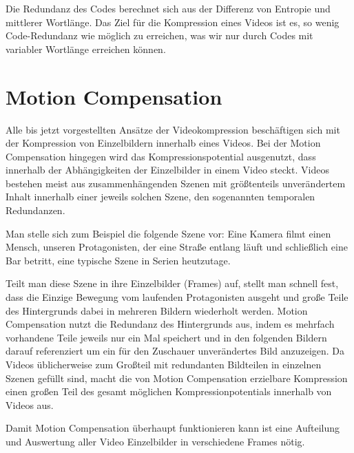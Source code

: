 Die Redundanz des Codes berechnet sich aus der Differenz von Entropie und mittlerer Wortlänge. Das Ziel für die Kompression eines Videos ist es, so wenig Code-Redundanz wie möglich zu erreichen, was wir nur durch Codes mit variabler Wortlänge erreichen können.


\section{Motion Compensation}

Alle bis jetzt vorgestellten Ansätze der Videokompression beschäftigen sich mit der Kompression von Einzelbildern innerhalb eines Videos. Bei der Motion Compensation hingegen wird das Kompressionspotential ausgenutzt, dass innerhalb der Abhängigkeiten der Einzelbilder in einem Video steckt.
Videos bestehen meist aus zusammenhängenden Szenen mit größtenteils unverändertem Inhalt innerhalb einer jeweils solchen Szene, den sogenannten temporalen Redundanzen.

Man stelle sich zum Beispiel die folgende Szene vor: Eine Kamera filmt einen Mensch, unseren Protagonisten, der eine Straße entlang läuft und schließlich eine Bar betritt, eine typische Szene in Serien heutzutage.

Teilt man diese Szene in ihre Einzelbilder (Frames) auf, stellt man schnell fest, dass die Einzige Bewegung vom laufenden Protagonisten ausgeht und große Teile des Hintergrunds dabei in mehreren Bildern wiederholt werden.
Motion Compensation nutzt die Redundanz des Hintergrunds aus, indem es mehrfach vorhandene Teile jeweils nur ein Mal speichert und in den folgenden Bildern darauf referenziert um ein für den Zuschauer unverändertes Bild anzuzeigen.
Da Videos üblicherweise zum Großteil mit redundanten Bildteilen in einzelnen Szenen gefüllt sind, macht die von Motion Compensation erzielbare Kompression einen großen Teil des gesamt möglichen Kompressionpotentials innerhalb von Videos aus.

Damit Motion Compensation überhaupt funktionieren kann ist eine Aufteilung und Auswertung aller Video Einzelbilder in verschiedene Frames nötig.
